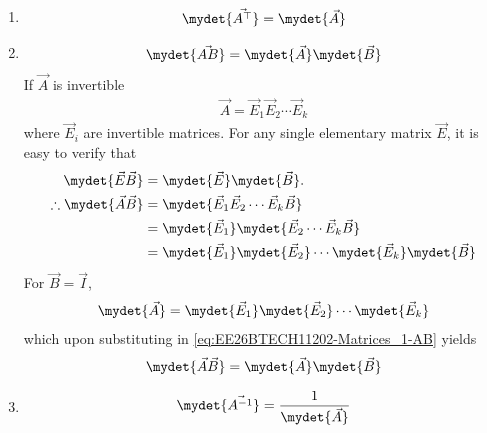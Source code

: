 \begin{enumerate}[label=\thesubsection.\arabic*, ref=\thesubsection.\theenumi]
\begin{align}
{3 & 12 & 6
}
\end{align}
Following row reduction, 
\begin{align}
\vec{A} \xrightarrow{R_2 \to R_2 - 2R_1} \myvec{
1 & 4 & 2 \\
0 & 0 & 0 \\
3 & 12 & 6
}
\xrightarrow{R_3 \to R_3 - 3R_1} \myvec{
1 & 4 & 2 \\
0 & 0 & 0 \\
0 & 0 & 0
}
\end{align}
yielding
			\eqref{eq:EE26BTECH11202-rank-one}.
	\item 
	\begin{align}
	\mydet{\vec{A^{\top}}} = \mydet{\vec{A}} \label{eq:EE26BTECH11202-Matrices_1} 
	\end{align}
\item 
	\begin{align}
	\mydet{\vec{AB}} = \mydet{\vec{A}}\mydet{\vec{B}} 
	\end{align}
\solution
If $\vec{A}$ is invertible 
\begin{align}
\vec{A} = \vec{E}_1 \vec{E}_2 \cdots \vec{E}_k
\end{align}
where $\vec{E}_i$ are invertible matrices.
For any single elementary matrix $\vec{E}$, it is easy to verify that  
\begin{align}
	\mydet{\vec{E}\vec{B}} &= \mydet{\vec{E}}\mydet{\vec{B}}.
\\
\therefore
\mydet{\vec{A}\vec{B}} &= \mydet{\vec{E}_1 \vec{E}_2 \cdots \vec{E}_k \vec{B}} \\
&= \mydet{\vec{E}_1} \mydet{\vec{E}_2 \cdots \vec{E}_k \vec{B}} \\
&= \mydet{\vec{E}_1} \mydet{\vec{E}_2} \cdots \mydet{\vec{E}_k} \mydet{\vec{B}}
\label{eq:EE26BTECH11202-Matrices_1-AB} 
\end{align}
For $\vec{B}=\vec{I}$, 
\begin{align}
\mydet{\vec{A}} = \mydet{\vec{E}_1} \mydet{\vec{E}_2} \cdots \mydet{\vec{E}_k}
\end{align}
which upon substituting in 
\eqref{eq:EE26BTECH11202-Matrices_1-AB} 
yields
\begin{align}
	\mydet{\vec{A}\vec{B}} = \mydet{\vec{A}}\mydet{\vec{B}} \label{eq:EE26BTECH11202-product_determinant}
\end{align}
\item 
\begin{align}
\mydet{\vec{A^{-1}}} = \frac{1}{\mydet{\vec{A}}} \label{eq:EE26BTECH11202-Matrices_inverse}
\end{align}

\end{enumerate}
